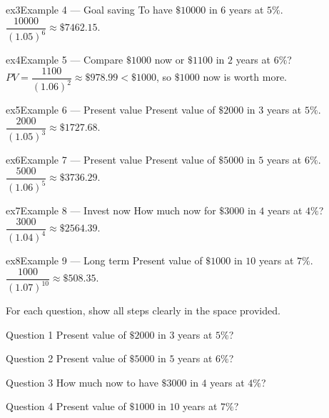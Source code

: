 \documentclass[11pt]{article}
\begin{document}
\begin{example}{ex3}{Example 4 --- Goal saving}
To have $\$10000$ in $6$ years at $5\%$.\soln $\dfrac{10000}{(1.05)^{6}}\approx\$7462.15$.
\end{example}

\begin{example}{ex4}{Example 5 --- Compare}
$\$1000$ now or $\$1100$ in $2$ years at $6\%$?\soln $PV=\dfrac{1100}{(1.06)^{2}}\approx\$978.99<\$1000$, so $\$1000$ now is worth more.
\end{example}

\begin{example}{ex5}{Example 6 --- Present value}
Present value of $\$2000$ in $3$ years at $5\%$.\soln $\dfrac{2000}{(1.05)^{3}}\approx\$1727.68$.
\end{example}

\begin{example}{ex6}{Example 7 --- Present value}
Present value of $\$5000$ in $5$ years at $6\%$.\soln $\dfrac{5000}{(1.06)^{5}}\approx\$3736.29$.
\end{example}

\begin{example}{ex7}{Example 8 --- Invest now}
How much now for $\$3000$ in $4$ years at $4\%$?\soln $\dfrac{3000}{(1.04)^{4}}\approx\$2564.39$.
\end{example}

\begin{example}{ex8}{Example 9 --- Long term}
Present value of $\$1000$ in $10$ years at $7\%$.\soln $\dfrac{1000}{(1.07)^{10}}\approx\$508.35$.
\end{example}

\clearpage
{}
For each question, show all steps clearly in the space provided.

\begin{qbox}{Question 1}
Present value of $\$2000$ in $3$ years at $5\%$?\workspace{2.4cm}
\end{qbox}

\begin{qbox}{Question 2}
Present value of $\$5000$ in $5$ years at $6\%$?\workspace{2.4cm}
\end{qbox}

\begin{qbox}{Question 3}
How much now to have $\$3000$ in $4$ years at $4\%$?\workspace{2.4cm}
\end{qbox}

\begin{qbox}{Question 4}
Present value of $\$1000$ in $10$ years at $7\%$?\workspace{2.4cm}
\end{qbox}
\end{document}
